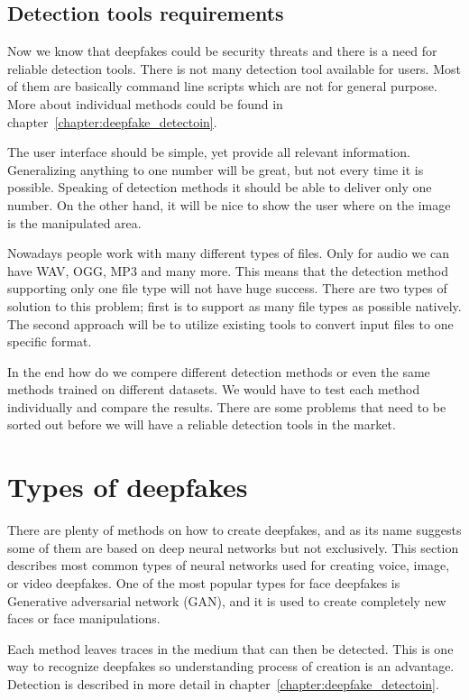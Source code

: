\section{Detection tools requirements}

Now we know that deepfakes could be security threats and there is a need for reliable detection tools. There is not many detection tool available for users. Most of them are basically command line scripts which are not for general purpose. More about individual methods could be found in chapter~\ref{chapter:deepfake_detectoin}.

The user interface should be simple, yet provide all relevant information. Generalizing anything to one number will be great, but not every time it is possible. Speaking of detection methods it should be able to deliver only one number. On the other hand, it will be nice to show the user where on the image is the manipulated area. 

Nowadays people work with many different types of files. Only for audio we can have WAV, OGG, MP3 and many more. This means that the detection method supporting only one file type will not have huge success. There are two types of solution to this problem; first is to support as many file types as possible natively. The second approach will be to utilize existing tools to convert input files to one specific format.

In the end how do we compere different detection methods or even the same methods trained on different datasets. We would have to test each method individually and compare the results. There are some problems that need to be sorted out before we will have a reliable detection tools in the market. 

\chapter{Types of deepfakes}
\label{chapter:deepfakes_creation}

There are plenty of methods on how to create deepfakes, and as its name suggests some of them are based on deep neural networks but not exclusively. This section describes most common types of neural networks used for creating voice, image, or video deepfakes. One of the most popular types for face deepfakes is Generative adversarial network (GAN), and it is used to create completely new faces or face manipulations.

Each method leaves traces in the medium that can then be detected. This is one way to recognize deepfakes so understanding process of creation is an advantage. Detection is described in more detail in chapter~\ref{chapter:deepfake_detectoin}.

